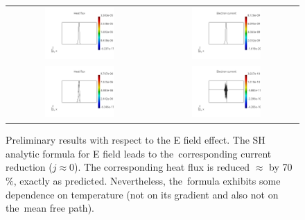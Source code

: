 \documentclass[review]{elsarticle}
\begin{document}
\begin{figure}[tbh]
  \begin{center}
    \begin{tabular}{cc}
      \includegraphics[width=0.5\textwidth]{figs/hflux_p51DKn1e-9.png} &
      \includegraphics[width=0.5\textwidth]{figs/jcurrent_p51DKn1e-9.png} \\
	  \includegraphics[width=0.5\textwidth]{figs/hflux_p51DKn1e-9Efield.png} &
      \includegraphics[width=0.5\textwidth]{figs/jcurrent_p51DKn1e-9Efield.png}  
    \end{tabular}
  \caption{
    Preliminary results with respect to the E field effect. 
	The SH analytic formula for E field leads to the~corresponding current 
	reduction ($j \approx 0$). The corresponding heat flux is reduced 
	$\approx$ by 70 $\%$, exactly as predicted. Nevertheless, the~formula 
	exhibits some dependence on temperature (not on its gradient and also not
	on the~mean free path).
  }
  \end{center}
  \label{fig:p41D_rho_T}
\end{figure}
\clearpage
\end{document}
